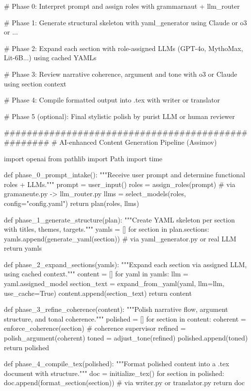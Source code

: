 \documentclass[12pt,a4paper]{article}
\begin{document}
\newpage
			
			\begin{metaoutput}
# Phase 0: Interpret prompt and assign roles with grammarnaut + llm_router

# Phase 1: Generate structural skeleton with yaml_generator using Claude or o3 or ...

# Phase 2: Expand each section with role-assigned LLMs (GPT-4o, MythoMax, Lit-6B...) using cached YAMLs

# Phase 3: Review narrative coherence, argument and tone with o3 or Claude using section context

# Phase 4: Compile formatted output into .tex with writer or translator

# Phase 5 (optional): Final stylistic polish by purist LLM or human reviewer

###################################################
# AI-enhanced Content Generation Pipeline (Assimov)

import openai
from pathlib import Path
import time

def phase_0_prompt_intake():
    """Receive user prompt and determine functional roles + LLMs."""
    prompt = user_input()
    roles = assign_roles(prompt)  # via gramaneute.py -> llm_router.py
    llms = select_models(roles, config="config.yaml")
    return plan(roles, llms)

def phase_1_generate_structure(plan):
    """Create YAML skeleton per section with titles, themes, targets."""
    yamls = []
    for section in plan.sections:
    yamls.append(generate_yaml(section))  # via yaml_generator.py or real LLM
    return yamls

def phase_2_expand_sections(yamls):
    """Expand each section via assigned LLM, using cached context."""
    content = []
    for yaml in yamls:
        llm = yaml.assigned_model
        section_text = expand_from_yaml(yaml, llm=llm, use_cache=True)
        content.append(section_text)
    return content

def phase_3_refine_coherence(content):
    """Polish narrative flow, argument structure, and tonal coherence."""
    polished = []
    for section in content:
        coherent = enforce_coherence(section)  # coherence supervisor
        refined = polish_argument(coherent)
        toned = adjust_tone(refined)
        polished.append(toned)
    return polished

def phase_4_compile_tex(polished):
    """Format polished content into a .tex document with structure."""
    doc = initialize_tex()
    for section in polished:
        doc.append(format_section(section))  # via writer.py or translator.py
    return doc


\end{metaoutput}
\end{document}
